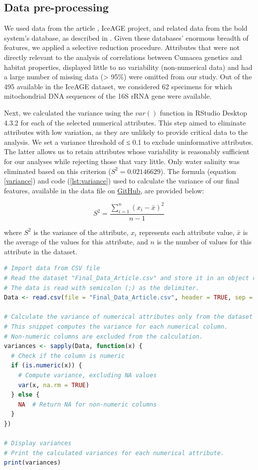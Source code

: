 \subsection{Data pre-processing}
We used data from the article \cite{uhlir_adding_2021}, IceAGE project, and related data from the bold system's database, as described in \citep{uhlir_adding_2021}. Given these databases' enormous breadth of features, we applied a selective reduction procedure. Attributes that were not directly relevant to the analysis of correlations between Cumacea genetics and habitat properties, displayed little to no variability (non-numerical data) and had a large number of missing data (> 95\%) were omitted from our study. Out of the 495 available in the IceAGE dataset, we considered 62 specimens for which mitochondrial DNA sequences of the 16S rRNA gene were available. 

Next, we calculated the variance using the $var()$ function in RStudio Desktop 4.3.2 for each of the selected numerical attributes. This step aimed to eliminate attributes with low variation, as they are unlikely to provide critical data to the analysis. We set a variance threshold of ≤ 0.1 to exclude uninformative attributes. The latter allows us to retain attributes whose variability is reasonably sufficient for our analyses while rejecting those that vary little. Only water salinity was eliminated based on this criterion ($S^2 = 0.02146629$). The formula (equation \ref{variance}) and code (\autoref{lst:variance}) used to calculate the variance of our final features, available in the data file on \href{https://github.com/tahiri-lab/Cumacea_aPhyloGeo}{GitHub}, are provided below:

\begin{equation}\label{variance}
    S^2 = \frac{\sum_{i=1}^{n} (x_i - \bar{x})^2}{n-1}
\end{equation}

where $S^2$ is the variance of the attribute, $x_i$ represents each attribute value, $\bar{x}$ is the average of the values for this attribute, and $n$ is the number of values for this attribute in the dataset.

\begin{lstlisting}[label=lst:variance,language=R,caption=RStudio script to calculate the variance of each numerical attributes in our final dataset]
# Import data from CSV file
# Read the dataset "Final_Data_Article.csv" and store it in an object called Data.
# The data is read with semicolon (;) as the delimiter.
Data <- read.csv(file = "Final_Data_Article.csv", header = TRUE, sep = ";")

# Calculate the variance of numerical attributes only from the dataset
# This snippet computes the variance for each numerical column.
# Non-numeric columns are excluded from the calculation.
variances <- sapply(Data, function(x) {
  # Check if the column is numeric
  if (is.numeric(x)) {
    # Compute variance, excluding NA values
    var(x, na.rm = TRUE)
  } else {
    NA  # Return NA for non-numeric columns
  }
})

# Display variances
# Print the calculated variances for each numerical attribute.
print(variances)
\end{lstlisting}

